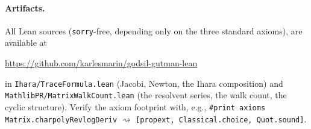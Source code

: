 \documentclass[11pt]{article}
\newcommand{\lean}[1]{{\def\_{\textunderscore\allowbreak}\texttt{#1}}}
\begin{document}
\paragraph{Artifacts.} All Lean sources (\lean{sorry}-free, depending only on the three standard
axioms), are available at
\begin{center}
\url{https://github.com/karlesmarin/godsil-gutman-lean}
\end{center}
{\sloppy in \lean{Ihara/TraceFormula.lean} (Jacobi, Newton, the Ihara composition) and
\lean{MathlibPR/MatrixWalkCount.lean} (the resolvent series, the walk count, the cyclic structure).
Verify the axiom footprint with, e.g., \lean{\#print axioms Matrix.charpolyRev\_logDeriv}
$\rightsquigarrow$ \lean{[propext, Classical.choice, Quot.sound]}.\par}
\end{document}
